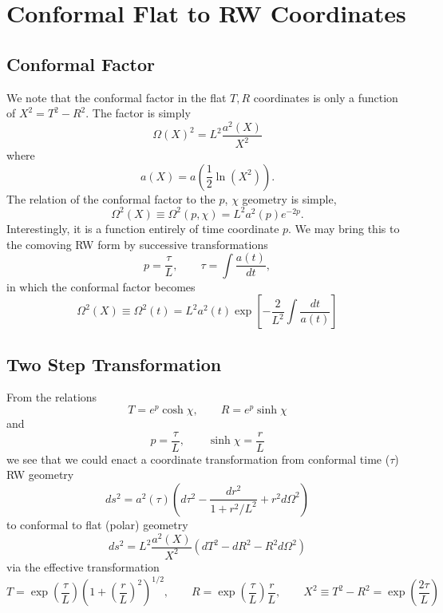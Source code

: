 \documentclass[10pt,letterpaper]{article}
\begin{document}
\section*{Conformal Flat to RW Coordinates}
\subsection*{Conformal Factor}
We note that the conformal factor in the flat $T,R$ coordinates is only a function of $X^2 = T^2-R^2$. The factor is simply
\begin{equation}
\Omega(X)^2 = L^2\frac{a^2(X)}{X^2}
\end{equation}
where 
\begin{equation}
a(X)=a\left(\frac12 \ln(X^2)\right).
\end{equation}
The relation of the conformal factor to the $p$, $\chi$ geometry is simple,
\begin{equation}
\Omega^2(X) \equiv \Omega^2(p,\chi) = L^2 a^2(p)e^{-2p}.
\end{equation}
Interestingly, it is a function entirely of time coordinate $p$. 
We may bring this to the comoving RW form by successive transformations
\begin{equation}
p = \frac{\tau}{L},\qquad \tau = \int \frac{a(t)}{dt},
\end{equation}
in which the conformal factor becomes
\begin{equation}
\Omega^2(X) \equiv \Omega^2(t) = L^2 a^2(t) \exp\left[{-\frac{2}{L^2}\int\frac{dt}{a(t)}}\right]
\end{equation}
\subsection*{Two Step Transformation}
From the relations
\begin{equation}
T = e^{p}\cosh \chi,\qquad R = e^{p}\sinh \chi
\end{equation}
and
\begin{equation}
p = \frac{\tau}{L},\qquad \sinh \chi = \frac{r}{L}
\end{equation}
we see that we could enact a coordinate transformation from conformal time ($\tau$) RW geometry
\begin{equation}
ds^2 = a^2(\tau) \left ( d\tau^2 - \frac{dr^2}{1+r^2/L^2} + r^2 d\Omega^2 \right)
\end{equation}
to conformal to flat (polar) geometry
\begin{equation}
ds^2 = L^2\frac{a^2(X)}{X^2} \left( dT^2 - dR^2 - R^2 d\Omega^2\right)
\end{equation}
via the effective transformation
\begin{equation}
T = \exp\left(\frac{\tau}{L}\right)\left( 1+ \left(\frac{r}{L}\right)^2\right)^{1/2},\qquad R = \exp\left(\frac{\tau}{L}\right)\frac{r}{L},\qquad X^2 \equiv T^2-R^2 = \exp\left(\frac{2\tau}{L}\right)
\end{equation}
\end{document}
